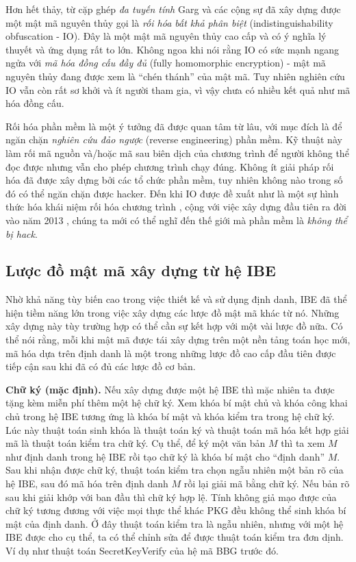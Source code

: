 \documentclass[class=report, crop=false]{standalone}
\begin{document}
			Hơn hết thảy, từ cặp ghép \emph{đa tuyến tính} Garg và các cộng sự \cite{DBLP:conf/focs/GargGH0SW13} đã xây dựng được một mật mã nguyên thủy gọi là \textit{rối hóa bất khả phân biệt} (indistinguishability obfuscation - IO). Đây là một mật mã nguyên thủy cao cấp và có ý nghĩa lý thuyết và ứng dụng rất to lớn. Không ngoa khi nói rằng IO có sức mạnh ngang ngửa với \textit{mã hóa đồng cấu đầy đủ} (fully homomorphic encryption) - mật mã nguyên thủy đang được xem là ``chén thánh'' của mật mã. Tuy nhiên nghiên cứu IO vẫn còn rất sơ khởi và ít người tham gia, vì vậy chưa có nhiều kết quả như mã hóa đồng cấu.
			
			Rối hóa phần mềm là một ý tưởng đã được quan tâm từ lâu, với mục đích là để ngăn chặn \textit{nghiên cứu đảo ngược} (reverse engineering) phần mềm. Kỹ thuật này làm rối mã nguồn và/hoặc mã sau biên dịch của chương trình để người không thể đọc được nhưng vẫn cho phép chương trình chạy đúng. Không ít giải pháp rối hóa đã được xây dựng bởi các tổ chức phần mềm, tuy nhiên không nào trong số đó có thể ngăn chặn được hacker. Đến khi IO được đề xuất như là một sự hình thức hóa khái niệm rối hóa chương trình \cite{DBLP:conf/crypto/BarakGIRSVY01}, cộng với việc xây dựng đầu tiên ra đời vào năm 2013 \cite{DBLP:conf/focs/GargGH0SW13}, chúng ta mới có thể nghĩ đến thế giới mà phần mềm là \emph{không thể bị hack}.
		\subsection{Lược đồ mật mã xây dựng từ hệ IBE}
			Nhờ khả năng tùy biến cao trong việc thiết kế và sử dụng định danh, IBE đã thể hiện tiềm năng lớn trong việc xây dựng các lược đồ mật mã khác từ nó. Những xây dựng này tùy trường hợp có thể cần sự kết hợp với một vài lược đồ nữa. Có thể nói rằng, mỗi khi mật mã được tái xây dựng trên một nền tảng toán học mới, mã hóa dựa trên định danh là một trong những lược đồ cao cấp đầu tiên được tiếp cận sau khi đã có đủ các lược đồ cơ bản.

			\noindent
			\textbf{Chữ ký (mặc định).}\hspace{1ex} Nếu xây dựng được một hệ IBE thì mặc nhiên ta được tặng kèm miễn phí thêm một hệ chữ ký. Xem khóa bí mật chủ và khóa công khai chủ trong hệ IBE tương ứng là khóa bí mật và khóa kiểm tra trong hệ chữ ký. Lúc này thuật toán sinh khóa là thuật toán ký và thuật toán mã hóa kết hợp giải mã là thuật toán kiểm tra chữ ký. Cụ thể, để ký một văn bản $M$ thì ta xem $M$ như định danh trong hệ IBE rồi tạo chữ ký là khóa bí mật cho ``định danh'' $M$. Sau khi nhận được chữ ký, thuật toán kiểm tra chọn ngẫu nhiên một bản rõ của hệ IBE, sau đó mã hóa trên định danh $M$ rồi lại giải mã bằng chữ ký. Nếu bản rõ sau khi giải khớp với ban đầu thì chữ ký hợp lệ. Tính không giả mạo được của chữ ký tương đương với việc mọi thực thể khác PKG đều không thể sinh khóa bí mật của định danh. Ở đây thuật toán kiểm tra là ngẫu nhiên, nhưng với một hệ IBE được cho cụ thể, ta có thể chỉnh sửa để được thuật toán kiểm tra đơn dịnh. Ví dụ như thuật toán \textsf{SecretKeyVerify} của hệ mã BBG trước đó.
\end{document}
